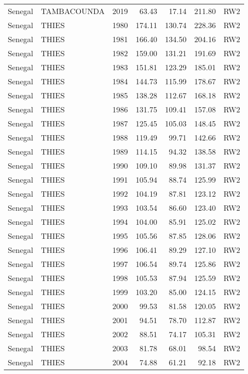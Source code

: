 \begin{longtable}{lllrrrl}
  Senegal & TAMBACOUNDA & 2019 & 63.43 & 17.14 & 211.80 & RW2 \\ 
  Senegal & THIES & 1980 & 174.11 & 130.74 & 228.36 & RW2 \\ 
  Senegal & THIES & 1981 & 166.40 & 134.50 & 204.16 & RW2 \\ 
  Senegal & THIES & 1982 & 159.00 & 131.21 & 191.69 & RW2 \\ 
  Senegal & THIES & 1983 & 151.81 & 123.29 & 185.01 & RW2 \\ 
  Senegal & THIES & 1984 & 144.73 & 115.99 & 178.67 & RW2 \\ 
  Senegal & THIES & 1985 & 138.28 & 112.67 & 168.18 & RW2 \\ 
  Senegal & THIES & 1986 & 131.75 & 109.41 & 157.08 & RW2 \\ 
  Senegal & THIES & 1987 & 125.45 & 105.03 & 148.45 & RW2 \\ 
  Senegal & THIES & 1988 & 119.49 & 99.71 & 142.66 & RW2 \\ 
  Senegal & THIES & 1989 & 114.15 & 94.32 & 138.58 & RW2 \\ 
  Senegal & THIES & 1990 & 109.10 & 89.98 & 131.37 & RW2 \\ 
  Senegal & THIES & 1991 & 105.94 & 88.74 & 125.99 & RW2 \\ 
  Senegal & THIES & 1992 & 104.19 & 87.81 & 123.12 & RW2 \\ 
  Senegal & THIES & 1993 & 103.54 & 86.60 & 123.40 & RW2 \\ 
  Senegal & THIES & 1994 & 104.00 & 85.91 & 125.02 & RW2 \\ 
  Senegal & THIES & 1995 & 105.56 & 87.85 & 128.06 & RW2 \\ 
  Senegal & THIES & 1996 & 106.41 & 89.29 & 127.10 & RW2 \\ 
  Senegal & THIES & 1997 & 106.54 & 89.74 & 125.86 & RW2 \\ 
  Senegal & THIES & 1998 & 105.53 & 87.94 & 125.59 & RW2 \\ 
  Senegal & THIES & 1999 & 103.20 & 85.00 & 124.15 & RW2 \\ 
  Senegal & THIES & 2000 & 99.53 & 81.58 & 120.05 & RW2 \\ 
  Senegal & THIES & 2001 & 94.51 & 78.70 & 112.87 & RW2 \\ 
  Senegal & THIES & 2002 & 88.51 & 74.17 & 105.31 & RW2 \\ 
  Senegal & THIES & 2003 & 81.78 & 68.01 & 98.54 & RW2 \\ 
  Senegal & THIES & 2004 & 74.88 & 61.21 & 92.18 & RW2 \\ 

\end{longtable}
